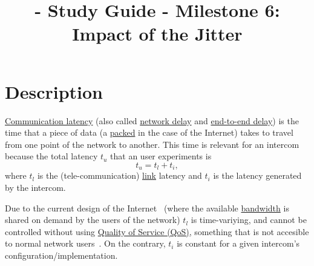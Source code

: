 
\title{\TM - Study Guide - Milestone 6: Impact of the Jitter}

\maketitle

\section{Description}

\href{https://en.wikipedia.org/wiki/Latency_(engineering)#Communication_latency}{Communication
  latency} (also called
\href{https://en.wikipedia.org/wiki/Network_delay}{network delay} and
\href{https://en.wikipedia.org/wiki/End-to-end_delay}{end-to-end
  delay}) is the time that a piece of data (a
\href{https://en.wikipedia.org/wiki/Network_packet}{packed} in the
case of the Internet) takes to travel from one point of the network to
another. This time is relevant for an intercom because the total
latency $t_u$ that an user experiments is
\begin{equation}
  t_u = t_l + t_i,
  \label{eq:user_latency}
\end{equation}
where $t_l$ is the (tele-communication)
\href{https://en.wikipedia.org/wiki/Telecommunications_link}{link}
latency and $t_i$ is the latency generated by the intercom.

Due to the current design of the Internet~\cite{Tanenbaum,Stallings} (where the
available
\href{https://en.wikipedia.org/wiki/Bandwidth_(computing)}{bandwidth}
is shared on demand by the users of the network) $t_l$ is
time-variying, and cannot be controlled without using
\href{https://en.wikipedia.org/wiki/Quality_of_service}{Quality of
  Service (QoS)}, something that is not accesible to normal network
users~\cite{dordal2020intro}. On the contrary, $t_i$ is constant for a
given intercom's configuration/implementation.

